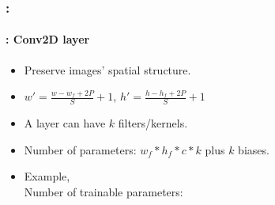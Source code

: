 \documentclass[xcolor=table]{beamer}
\begin{document}
\begin{frame}
	\frametitle{\insertshortsubtitle: \insertsection}
	\framesubtitle{\insertsubsection: Conv2D layer}
	
	\begin{minipage}{0.60\textwidth} 
		\begin{itemize}
			\item Preserve images' spatial structure.
			\item $ w' = \frac{w - w_f + 2P}{S} + 1$, $ h' = \frac{h - h_f + 2P}{S} + 1$
			\item A layer can have $k$ filters/kernels.
			\item Number of parameters: $w_f * h_f * c * k$ plus $k$ biases.
			\item Example,   \\ Number of trainable parameters: 
		\end{itemize}
	\end{minipage}
	\begin{minipage}{0.39\textwidth}
		
	\end{minipage}

\end{frame}
\end{document}
